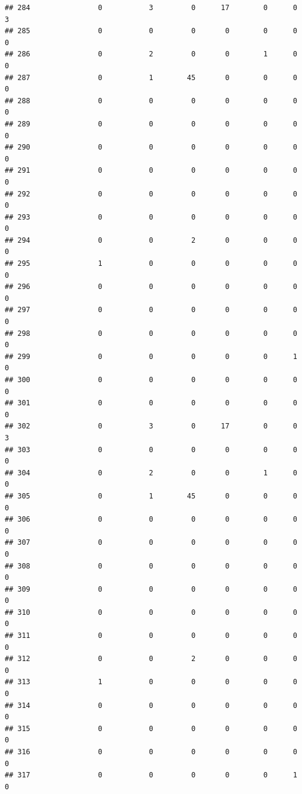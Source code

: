\documentclass[
]{article}
\begin{document}
\begin{verbatim}
## 284                0           3         0      17        0      0      3
## 285                0           0         0       0        0      0      0
## 286                0           2         0       0        1      0      0
## 287                0           1        45       0        0      0      0
## 288                0           0         0       0        0      0      0
## 289                0           0         0       0        0      0      0
## 290                0           0         0       0        0      0      0
## 291                0           0         0       0        0      0      0
## 292                0           0         0       0        0      0      0
## 293                0           0         0       0        0      0      0
## 294                0           0         2       0        0      0      0
## 295                1           0         0       0        0      0      0
## 296                0           0         0       0        0      0      0
## 297                0           0         0       0        0      0      0
## 298                0           0         0       0        0      0      0
## 299                0           0         0       0        0      1      0
## 300                0           0         0       0        0      0      0
## 301                0           0         0       0        0      0      0
## 302                0           3         0      17        0      0      3
## 303                0           0         0       0        0      0      0
## 304                0           2         0       0        1      0      0
## 305                0           1        45       0        0      0      0
## 306                0           0         0       0        0      0      0
## 307                0           0         0       0        0      0      0
## 308                0           0         0       0        0      0      0
## 309                0           0         0       0        0      0      0
## 310                0           0         0       0        0      0      0
## 311                0           0         0       0        0      0      0
## 312                0           0         2       0        0      0      0
## 313                1           0         0       0        0      0      0
## 314                0           0         0       0        0      0      0
## 315                0           0         0       0        0      0      0
## 316                0           0         0       0        0      0      0
## 317                0           0         0       0        0      1      0

\end{verbatim}
\end{document}
